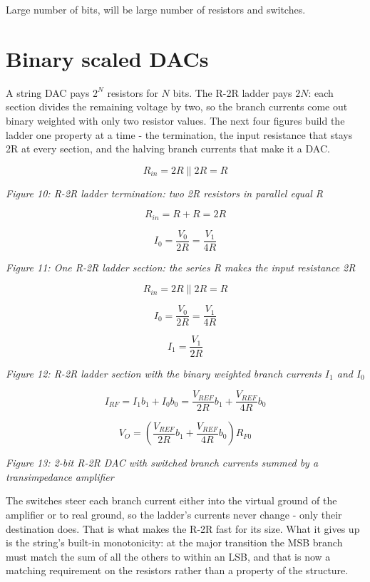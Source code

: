 Large number of bits, will be large number of resistors and switches.

\section{Binary scaled DACs}\label{binary-scaled-dacs}

A string DAC pays \(2^N\) resistors for \(N\) bits. The R-2R ladder pays
\(2N\): each section divides the remaining voltage by two, so the branch
currents come out binary weighted with only two resistor values. The
next four figures build the ladder one property at a time - the
termination, the input resistance that stays 2R at every section, and
the halving branch currents that make it a DAC.

\[ R_{in} = 2R \parallel 2R = R \]


{
\centering
{}
}

\emph{Figure 10: R-2R ladder termination: two 2R resistors in parallel
equal R}

\[ R_{in} = R + R = 2R \]

\[ I_{0} = \frac{V_0}{2R} = \frac{V_1}{4R} \]


{
\centering
{}
}

\emph{Figure 11: One R-2R ladder section: the series R makes the input
resistance 2R}

\[ R_{in} = 2R \parallel 2R = R \]

\[ I_{0} = \frac{V_0}{2R} = \frac{V_1}{4R} \]

\[ I_{1} = \frac{V_1}{2R}\]


{
\centering
{}
}

\emph{Figure 12: R-2R ladder section with the binary weighted branch
currents \(I_1\) and \(I_0\)}

\[ I_{RF} = I_1b_1 + I_0b_0 = \frac{V_{REF}}{2R}b_1 + \frac{V_{REF}}{4R}b_0 \]

\[ V_{O} = \left(\frac{V_{REF}}{2R}b_1 + \frac{V_{REF}}{4R}b_0\right)R_{F0}\]


{
\centering
{}
}

\emph{Figure 13: 2-bit R-2R DAC with switched branch currents summed by
a transimpedance amplifier}

The switches steer each branch current either into the virtual ground of
the amplifier or to real ground, so the ladder's currents never change -
only their destination does. That is what makes the R-2R fast for its
size. What it gives up is the string's built-in monotonicity: at the
major transition the MSB branch must match the sum of all the others to
within an LSB, and that is now a matching requirement on the resistors
rather than a property of the structure.

